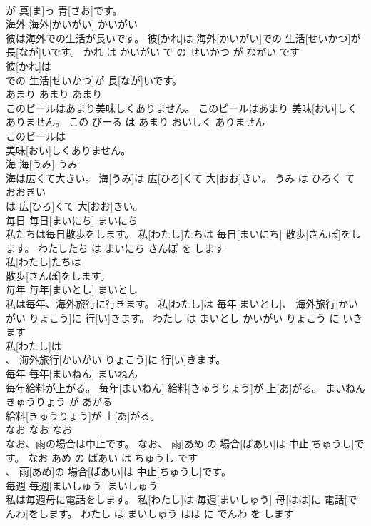 \documentclass[8pt]{extreport}
\begin{document}
\begin{CJK}{UTF8}{min}
\\	が 真[ま]っ 青[さお]です。		
\\	海外	海外[かいがい]	かいがい	
\\	彼は海外での生活が長いです。	彼[かれ]は 海外[かいがい]での 生活[せいかつ]が 長[なが]いです。	かれ は かいがい で の せいかつ が ながい です	
\\	彼[かれ]は
\\	での 生活[せいかつ]が 長[なが]いです。		
\\	あまり	あまり	あまり	
\\	このビールはあまり美味しくありません。	このビールはあまり 美味[おい]しくありません。	この びーる は あまり おいしく ありません	
\\	このビールは
\\	美味[おい]しくありません。		
\\	海	海[うみ]	うみ	
\\	海は広くて大きい。	海[うみ]は 広[ひろ]くて 大[おお]きい。	うみ は ひろく て おおきい	
\\	は 広[ひろ]くて 大[おお]きい。		
\\	毎日	毎日[まいにち]	まいにち	
\\	私たちは毎日散歩をします。	私[わたし]たちは 毎日[まいにち] 散歩[さんぽ]をします。	わたしたち は まいにち さんぽ を します	
\\	私[わたし]たちは
\\	散歩[さんぽ]をします。		
\\	毎年	毎年[まいとし]	まいとし	
\\	私は毎年、海外旅行に行きます。	私[わたし]は 毎年[まいとし]、 海外旅行[かいがい りょこう]に 行[い]きます。	わたし は まいとし かいがい りょこう に いきます	
\\	私[わたし]は
\\	、 海外旅行[かいがい りょこう]に 行[い]きます。		
\\	毎年	毎年[まいねん]	まいねん	
\\	毎年給料が上がる。	毎年[まいねん] 給料[きゅうりょう]が 上[あ]がる。	まいねん きゅうりょう が あがる	
\\	給料[きゅうりょう]が 上[あ]がる。		
\\	なお	なお	なお	
\\	なお、雨の場合は中止です。	なお、 雨[あめ]の 場合[ばあい]は 中止[ちゅうし]です。	なお あめ の ばあい は ちゅうし です	
\\	、 雨[あめ]の 場合[ばあい]は 中止[ちゅうし]です。		
\\	毎週	毎週[まいしゅう]	まいしゅう	
\\	私は毎週母に電話をします。	私[わたし]は 毎週[まいしゅう] 母[はは]に 電話[でんわ]をします。	わたし は まいしゅう はは に でんわ を します	

\end{CJK}
\end{document}
